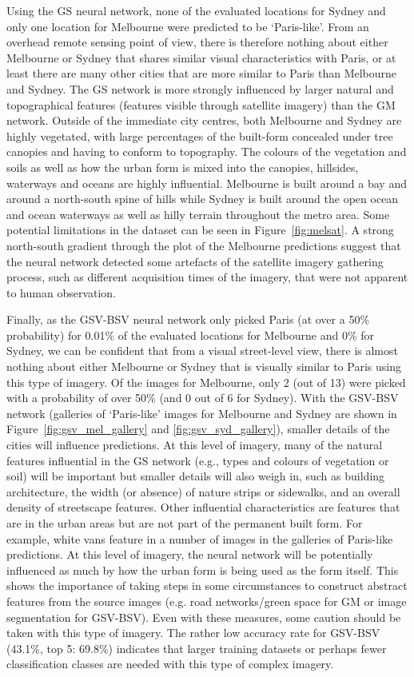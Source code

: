 \documentclass[Crown,sageh,times]{sagej}
\begin{document}
Using the GS neural network, none of the evaluated locations for Sydney and only one location for Melbourne were predicted to be `Paris-like'. From an overhead remote sensing point of view, there is therefore nothing about either Melbourne or Sydney that shares similar visual characteristics with Paris, or at least there are many other cities that are more similar to Paris than Melbourne and Sydney. The GS network is more strongly influenced by larger natural and topographical features (features visible through satellite imagery) than the GM network. Outside of the immediate city centres, both Melbourne and Sydney are highly vegetated, with large percentages of the built-form concealed under tree canopies and having to conform to topography. The colours of the vegetation and soils as well as how the urban form is mixed into the canopies, hillsides, waterways and oceans are highly influential. Melbourne is built around a bay and around a north-south spine of hills while Sydney is built around the open ocean and ocean waterways as well as hilly terrain throughout the metro area. Some potential limitations in the dataset can be seen in Figure~\ref{fig:melsat}. A strong north-south gradient through the plot of the Melbourne predictions suggest that the neural network detected some artefacts of the satellite imagery gathering process, such as different acquisition times of the imagery, that were not apparent to human observation. 

Finally, as the GSV-BSV neural network only picked Paris (at over a 50\% probability) for 0.01\% of the evaluated locations for Melbourne and 0\% for Sydney, we can be confident that from a visual street-level view, there is almost nothing about either Melbourne or Sydney that is visually similar to Paris using this type of imagery. Of the images for Melbourne, only 2 (out of 13) were picked with a probability of over 50\% (and 0 out of 6 for Sydney). With the GSV-BSV network (galleries of `Paris-like' images for Melbourne and Sydney are shown in Figure~\ref{fig:gsv_mel_gallery} and \ref{fig:gsv_syd_gallery}), smaller details of the cities will influence predictions. At this level of imagery, many of the natural features influential in the GS network (e.g., types and colours of vegetation or soil) will be important but smaller details will also weigh in, such as building architecture, the width (or absence) of nature strips or sidewalks, and an overall density of streetscape features. Other influential characteristics are features that are in the urban areas but are not part of the permanent built form. For example, white vans feature in a number of images in the galleries of Paris-like predictions. At this level of imagery, the neural network will be potentially influenced as much by how the urban form is being used as the form itself. This shows the importance of taking steps in some circumstances to construct abstract features from the source images (e.g. road networks/green space for GM or image segmentation for GSV-BSV). Even with these measures, some caution should be taken with this type of imagery. The rather low accuracy rate for GSV-BSV (43.1\%, top 5: 69.8\%) indicates that larger training datasets or perhaps fewer classification classes are needed with this type of complex imagery.
\end{document}
